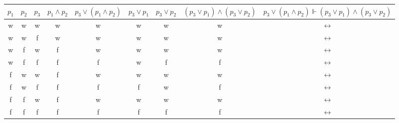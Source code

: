 \documentclass[10pt, a4paper]{exam}
\begin{document}
\begin{questions}
\begin{parts}
\begin{subparts}
\begin{solution}
                \begin{tabular}{c | c | c | c | c | c | c | c | c}
                    $p_1$ & $p_2$ & $p_3$ & $p_1\wedge p_2$ & $p_3\vee(p_1\wedge p_2)$ & $p_3\vee p_1$ & $p_3\vee p_2$ & $(p_3\vee p_1)\wedge(p_3\vee p_2)$ & $p_3\vee(p_1\wedge p_2) \Vdash (p_3\vee p_1)\wedge(p_3\vee p_2)$ \\\hline
                    w     & w     & w     & w               & w                        & w             & w             & w                                  & $\leftrightarrow$                                                \\
                    w     & w     & f     & w               & w                        & w             & w             & w                                  & $\leftrightarrow$                                                \\
                    w     & f     & w     & f               & w                        & w             & w             & w                                  & $\leftrightarrow$                                                \\
                    w     & f     & f     & f               & f                        & w             & f             & f                                  & $\leftrightarrow$                                                \\
                    f     & w     & w     & f               & w                        & w             & w             & w                                  & $\leftrightarrow$                                                \\
                    f     & w     & f     & f               & f                        & f             & w             & f                                  & $\leftrightarrow$                                                \\
                    f     & f     & w     & f               & w                        & w             & w             & w                                  & $\leftrightarrow$                                                \\
                    f     & f     & f     & f               & f                        & f             & f             & f                                  & $\leftrightarrow$                                                \\
                \end{tabular}
            \end{solution}
        \end{subparts}


\end{parts}
\end{questions}
\end{document}
